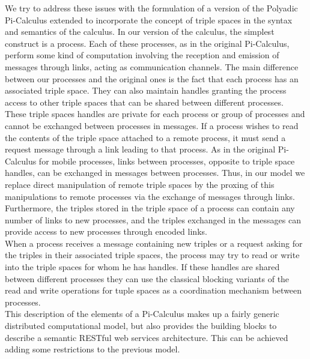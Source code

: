 We try to address these issues with the formulation of a version of the Polyadic Pi-Calculus
extended to incorporate the concept of triple spaces in the syntax and semantics of the calculus.  
In our version of the calculus, the simplest construct is a process. Each of these processes, as in the original
Pi-Calculus, perform some kind of computation involving the reception and emission of messages through links, acting as communication channels. The main
difference between our processes and the original ones is the fact that each process has an associated triple space. They can also
maintain handles granting the process access to other triple spaces that can be shared between different processes.\\ These
triple spaces handles are private for each process or group of processes and cannot be exchanged between processes in
messages. If a process wishes to read the contents of the triple space attached to a remote process, it must send a
request message through a link leading to that process. As in the original Pi-Calculus for mobile processes, links
between processes, opposite to triple space handles, can be exchanged in messages between processes. Thus, in our model
we replace direct manipulation of remote triple spaces by the proxing of this manipulations to remote processes via
the exchange of messages through links. Furthermore, the
triples stored in the triple space of a process can contain any number of links to new processes, and the triples
exchanged in the messages can provide access to new processes through encoded links.\\
When a process receives a message containing new triples or a request asking for the triples in their associated triple
spaces, the process may try to read or write into the triple spaces for whom he has handles. If these handles are shared
between different processes they can use the classical blocking variants of the read and write operations for tuple
spaces as a coordination mechanism between processes.\\

This description of the elements of a Pi-Calculus makes up a fairly generic distributed computational model, but also
provides the building blocks to describe a semantic RESTful web services architecture. This can be achieved adding some
restrictions to the previous model. \\

